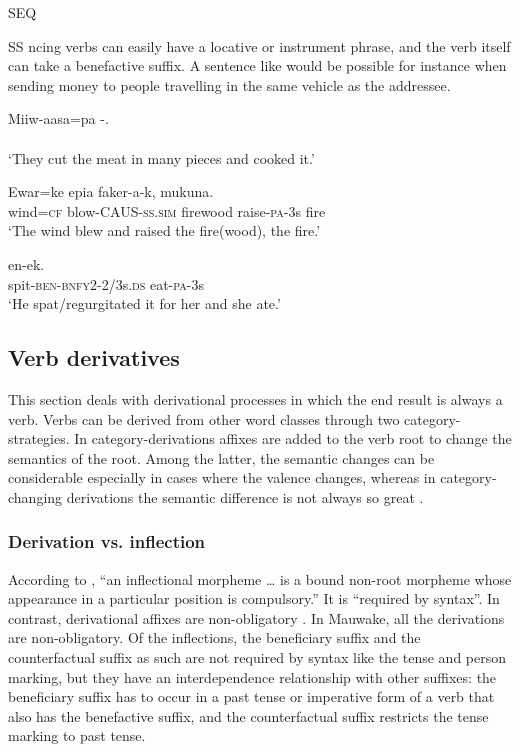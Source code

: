 SEQ 
 
 SS 
 ncing verbs can easily have a locative or instrument phrase, and the verb itself can take a benefactive suffix. A sentence like  would be possible for instance when sending money to people travelling in the same vehicle as the addressee. 

\ea%
\label{ex:3:x338}
\gll Miiw-aasa=pa -. \\ \\
\glt`They cut the meat in many pieces and cooked it.'
\z

\ea%
\label{ex:3:x186}
\gll Ewar=ke  epia faker-a-k, mukuna. \\
wind=\textsc{cf} blow-CAUS-\textsc{ss}.\textsc{sim} firewood raise-\textsc{pa}-3s fire \\
\glt`The wind blew and raised the fire(wood), the fire.' 
\z

\ea%
\label{ex:3:x187}
\gll {} en-ek. \\
spit-\textsc{ben}-\textsc{bnfy}2-2/3s.\textsc{ds} eat-\textsc{pa}-3s \\
\glt`He spat/regurgitated it for her and she ate.'
\z

\subsection{Verb derivatives}\label{sec:3:y:x}
{}
This section deals with derivational processes in which the end result is always a verb. Verbs can be derived from other word classes through two category- strategies. In category-derivations affixes are added to the verb root to change the semantics of the root. Among the latter, the semantic changes can be considerable especially in cases where the valence changes, whereas in category-changing derivations the semantic difference is not always so great \citep[83]{Bybee1985}. 

\subsubsection{Derivation vs. inflection}\label{sec:3:z:y:x}
{}
According to \citet[81]{Bybee1985}, ``{an inflectional morpheme {\dots} is a bound non-root morpheme whose appearance in a particular position is compulsory}.'' It is ``{required by syntax}''. In contrast, derivational affixes are non-obligatory \citep[191]{Greenberg1954}. In Mauwake, all the derivations are non-obligatory. Of the inflections, the beneficiary suffix and the counterfactual suffix as such are not required by syntax like the tense and person marking, but they have an interdependence relationship with other suffixes: the beneficiary suffix has to occur in a past tense or imperative form of a verb that also has the benefactive suffix, and the counterfactual suffix restricts the tense marking to past tense.


